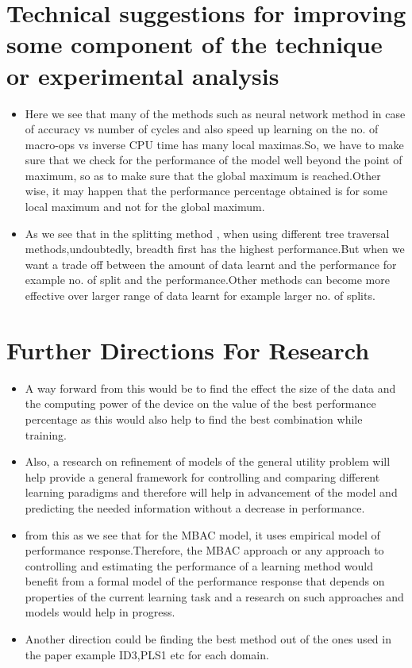 \documentclass{bmvc2k}
\begin{document}
\section{Technical suggestions for improving some component of the technique or experimental analysis}
\begin{itemize}
    \item 
Here we see that many of the methods such as neural network method in case of accuracy vs number of cycles and also speed up learning on the no. of macro-ops vs inverse CPU time has many local maximas.So, we have to make sure that we check for the performance of the model well beyond the point of maximum, so as to make sure that the global maximum is reached.Other wise, it may happen that the performance percentage obtained is for some local maximum and not for the global maximum.
\item
As we see that in the splitting method , when using different tree traversal methods,undoubtedly, breadth first has the highest performance.But when we want a trade off between the amount of data learnt and the performance  for example no. of split and the performance.Other methods can become more effective over larger range of data learnt for example larger no. of splits.


\end{itemize}

\section{Further Directions For Research}
\begin{itemize}
    \item A way forward from this would be to find the effect the size of the data and the computing power of the device on the value of the best performance percentage as this would also help to find the best combination while training.
    \item Also, a research on refinement of models of the general utility problem will help provide a general framework for controlling and comparing different learning paradigms and therefore will help in advancement of the model and predicting the needed information without a decrease in performance.
    \item from this as we see that for the MBAC model, it uses empirical model of performance response.Therefore, the MBAC approach or any approach to controlling and estimating the performance of a learning method would benefit from a formal model of the performance response that depends on properties of the current learning task and a research on such approaches and models would help in progress.
    \item Another direction could be finding the best method out of the ones used in the paper example ID3,PLS1 etc for each domain.
\end{itemize}
\end{document}
